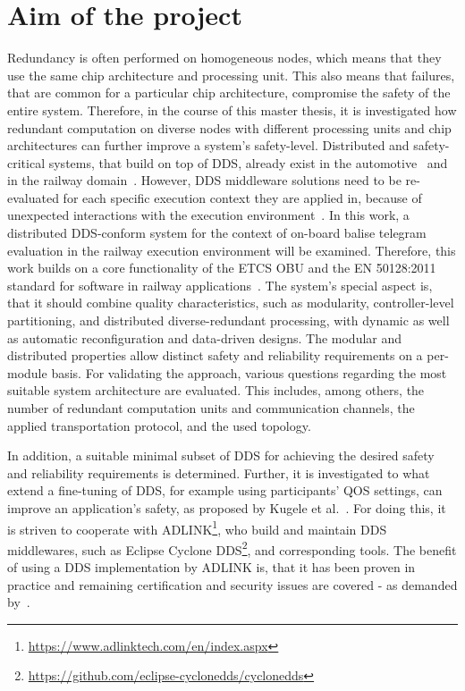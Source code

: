 \documentclass[a4paper, 12pt]{scrartcl}
\begin{document}
\section*{Aim of the project}
Redundancy is often performed on homogeneous nodes, which means that they use the same chip architecture and processing unit.
This also means that failures, that are common for a particular chip architecture, compromise the safety of the entire system.
Therefore, in the course of this master thesis, it is investigated how redundant computation on diverse nodes with different processing units and chip architectures can further improve a system's safety-level.
Distributed and safety-critical systems, that build on top of \gls*{DDS}, already exist in the automotive~\cite{DistributedSafety2020} and in the railway domain~\cite{DDSInURail}.
However, \gls*{DDS} middleware solutions need to be re-evaluated for each specific execution context they are applied in, because of unexpected interactions with the execution environment~\cite{CotroneoDDSFailureAnalysis}.
In this work, a distributed \gls*{DDS}-conform system for the context of on-board balise telegram evaluation in the railway execution environment will be examined.
Therefore, this work builds on a core functionality of the \gls*{ETCS} \gls*{OBU} and the EN 50128:2011 standard for software in railway applications~\cite{BoulangerStandards}.
The system's special aspect is, that it should combine quality characteristics, such as modularity, control\-ler-level partitioning, and distributed diverse-redundant processing, with dynamic as well as automatic reconfiguration and data-driven designs.
The modular and distributed properties allow distinct safety and reliability requirements on a per-module basis.
For validating the approach, various questions regarding the most suitable system architecture are evaluated.
This includes, among others, the number of redundant computation units and communication channels, the applied transportation protocol, and the used topology.

In addition, a suitable minimal subset of \gls*{DDS} for achieving the desired safety and reliability requirements is determined.
Further, it is investigated to what extend a fine-tuning of \gls*{DDS}, for example using participants' \gls*{QOS} settings, can improve an application's safety, as proposed by Kugele et al.~\cite{KugeleDataCentricForAuto}.
For doing this, it is striven to cooperate with ADLINK\footnote{\url{https://www.adlinktech.com/en/index.aspx}}, who build and maintain \gls*{DDS} middlewares, such as Eclipse Cyclone DDS\footnote{\url{https://github.com/eclipse-cyclonedds/cyclonedds}}, and corresponding tools.
The benefit of using a \gls*{DDS} implementation by ADLINK is, that it has been proven in practice and remaining certification and security issues are covered - as demanded by~\cite{KugeleDataCentricForAuto}.
\end{document}
